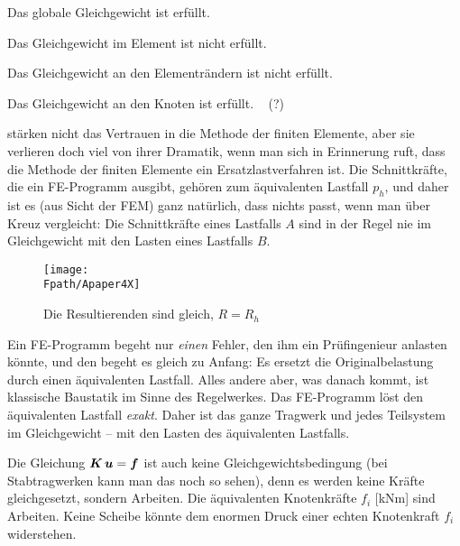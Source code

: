 \begin{itemize}
{\em
\item{Das globale Gleichgewicht ist erf\"{u}llt.}
\item{Das Gleichgewicht im Element ist nicht erf\"{u}llt.}
\item{Das Gleichgewicht an den Elementr\"{a}ndern ist nicht erf\"{u}llt.}
\item{Das Gleichgewicht an den Knoten ist erf\"{u}llt.  \,\,\,\,\,{\rm (?)}}
}
\end{itemize}
st\"{a}rken nicht das Vertrauen in die Methode der finiten Elemente, aber sie verlieren doch viel von ihrer Dramatik, wenn man sich in Erinnerung ruft, dass die Methode der finiten Elemente ein Ersatzlastverfahren ist. Die Schnittkr\"{a}fte, die ein FE-Programm ausgibt, geh\"{o}ren zum \"{a}quivalenten Lastfall $p_{h}$, und daher ist es (aus Sicht der FEM) ganz nat\"{u}rlich, dass nichts passt, wenn man \"{u}ber Kreuz vergleicht: Die Schnittkr\"{a}fte eines Lastfalls $A$ sind in der Regel nie im Gleichgewicht mit den Lasten eines Lastfalls $B$.
\begin{figure}[tbp] \centering
\if {} \sidecaption \fi
\texttt{[image: \\Fpath/Apaper4X]}
\caption{Die Resultierenden sind gleich, $R = R_h$} \label{Apaper4}
\end{figure}%

Ein FE-Programm begeht nur {\em  einen} Fehler, den ihm ein Pr\"{u}fingenieur anlasten k\"{o}nnte, und den begeht es gleich zu Anfang: Es ersetzt die Originalbelastung durch einen \"{a}quivalenten Lastfall. Alles andere aber, was danach kommt, ist klassische Baustatik im Sinne des Regelwerkes. Das FE-Programm l\"{o}st den \"{a}quivalenten Lastfall {\em exakt}. Daher ist das ganze Tragwerk und jedes Teilsystem im Gleichgewicht -- mit den Lasten des \"{a}quivalenten Lastfalls.

Die Gleichung $\mbox{\boldmath $K$}\,\mbox{\boldmath $u$} = \mbox{\boldmath $f$}$ ist auch keine Gleichgewichtsbedingung (bei Stabtragwerken kann man das noch so sehen), denn es werden keine Kr\"{a}fte gleichgesetzt, sondern Arbeiten. Die \"{a}quivalenten Knotenkr\"{a}fte $f_i$ [kNm] sind Arbeiten. Keine Scheibe k\"{o}nnte dem enormen Druck einer echten Knotenkraft $f_i$ widerstehen.

